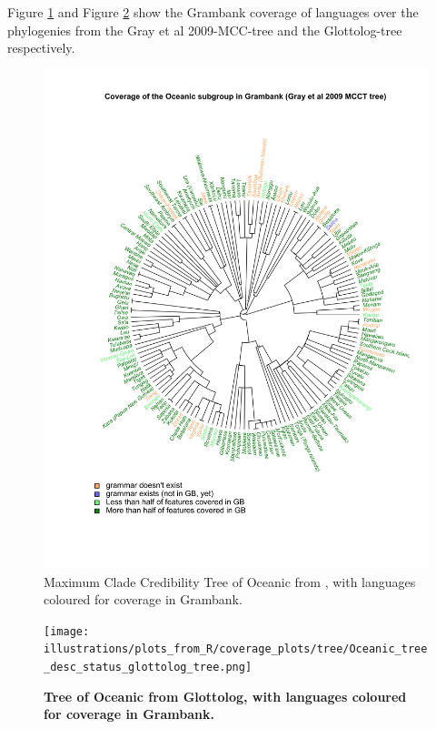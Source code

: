\documentclass[12pt,letterpaper]{article}
\begin{document}
Figure \ref{tree_coverage_oceanic_gray} and Figure \ref{tree_coverage_oceanic_glottolog} show the Grambank coverage of languages over the phylogenies from the Gray et al 2009-MCC-tree and the Glottolog-tree respectively. 

\begin{figure}[ht]
\centering
\includegraphics[width=\textwidth]{illustrations/plots_from_R/coverage_plots/tree/Oceanic_tree_desc_status_gray_et_al_tree_mcct.png}
\caption{{Maximum Clade Credibility Tree of Oceanic from \citet{grayetal_2009}, with languages coloured for coverage in Grambank.}}
\label{tree_coverage_oceanic_gray}
\end{figure}

\begin{figure}[ht]
\centering
\texttt{[image: illustrations/plots\_from\_R/coverage\_plots/tree/Oceanic\_tree\_desc\_status\_glottolog\_tree.png]}
\caption{\textbf{Tree of Oceanic from Glottolog, with languages coloured for coverage in Grambank.}}
\label{tree_coverage_oceanic_glottolog}
\end{figure}
\end{document}
